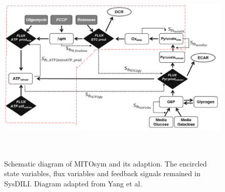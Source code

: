 \documentclass[12pt]{article}
\begin{document}
\begin{figure}[h!]
\centering
\includegraphics[width = 14cm, height = 9cm]{yang_model_modified.png}
\caption{Schematic diagram of MITOsym\textsuperscript{\textregistered} and its adaption. The encircled state variables, flux variables and feedback signals remained in SysDILI. Diagram adapted from Yang et al.\cite{y.yangMITOsymMechanisticMathematical2015} }
\label{fig:5}
\end{figure}
\end{document}
